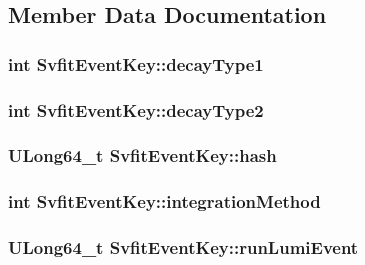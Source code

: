 \subsection{Member Data Documentation}
\hypertarget{classSvfitEventKey_a6d4378d317fc0e19a7ce7428c4524343}{
\subsubsection[{decayType1}]{\setlength{\rightskip}{0pt plus 5cm}int {\bf SvfitEventKey::decayType1}}}
\label{classSvfitEventKey_a6d4378d317fc0e19a7ce7428c4524343}
\hypertarget{classSvfitEventKey_a2a985c09ffce1e4e79cfa375c29f6ee0}{
\subsubsection[{decayType2}]{\setlength{\rightskip}{0pt plus 5cm}int {\bf SvfitEventKey::decayType2}}}
\label{classSvfitEventKey_a2a985c09ffce1e4e79cfa375c29f6ee0}
\hypertarget{classSvfitEventKey_a4a66e2828f6714fb510373c0df2fd3b6}{
\subsubsection[{hash}]{\setlength{\rightskip}{0pt plus 5cm}ULong64\_\-t {\bf SvfitEventKey::hash}}}
\label{classSvfitEventKey_a4a66e2828f6714fb510373c0df2fd3b6}
\hypertarget{classSvfitEventKey_a8e070522e0476b25b155fb94d4a53e56}{
\subsubsection[{integrationMethod}]{\setlength{\rightskip}{0pt plus 5cm}int {\bf SvfitEventKey::integrationMethod}}}
\label{classSvfitEventKey_a8e070522e0476b25b155fb94d4a53e56}
\hypertarget{classSvfitEventKey_afaa8e9d1f49d1717f6498c17a5b6a37a}{
\subsubsection[{runLumiEvent}]{\setlength{\rightskip}{0pt plus 5cm}ULong64\_\-t {\bf SvfitEventKey::runLumiEvent}}}
